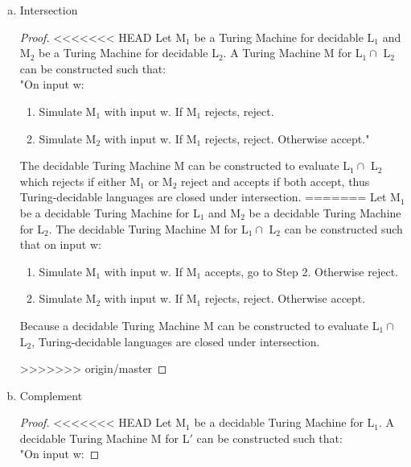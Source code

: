 ﻿\documentclass{article}
\begin{document}
\begin{enumerate}[a)]
\begin{enumerate}[a)]
\begin{proof}
Because a decidable Turing Machine M can be constructed to evaluate L$_{1} \cup$ L$_{2}$, Turing-decidable languages are closed under union.
>>>>>>> origin/master

\end{proof}

\item Intersection

\begin{proof}

<<<<<<< HEAD
Let M$_{1}$ be a Turing Machine for decidable L$_{1}$ and M$_{2}$ be a Turing Machine for decidable L$_{2}$. A Turing Machine M for L$_{1} \cap$ L$_{2}$ can be constructed such that:
\\"On input w:

\begin{enumerate} [1.]
\item Simulate M$_{1}$ with input w. If M$_{1}$ rejects, reject.
\item Simulate M$_{2}$ with input w. If M$_{1}$ rejects, reject. Otherwise accept."
\end{enumerate}

The decidable Turing Machine M can be constructed to evaluate L$_{1} \cap$ L$_{2}$ which rejects if either M$_{1}$ or M$_{2}$ reject and accepts if both accept, thus Turing-decidable languages are closed under intersection.
=======
Let M$_{1}$ be a decidable Turing Machine for L$_{1}$ and M$_{2}$ be a decidable Turing Machine for L$_{2}$. The decidable Turing Machine M for L$_{1} \cap$ L$_{2}$ can be constructed such that on input w:

\begin{enumerate} [1.]
\item Simulate M$_{1}$ with input w. If M$_{1}$ accepts, go to Step 2. Otherwise reject.
\item Simulate M$_{2}$ with input w. If M$_{1}$ rejects, reject. Otherwise accept.
\end{enumerate}

Because a decidable Turing Machine M can be constructed to evaluate L$_{1} \cap$ L$_{2}$, Turing-decidable languages are closed under intersection.

>>>>>>> origin/master
\end{proof}

\item Complement

\begin{proof}

<<<<<<< HEAD
Let M$_{1}$ be a decidable Turing Machine for L$_{1}$. A decidable Turing Machine M for L$'$ can be constructed such that:
\\"On input w:


\end{proof}
\end{enumerate}
\end{enumerate}
\end{document}
